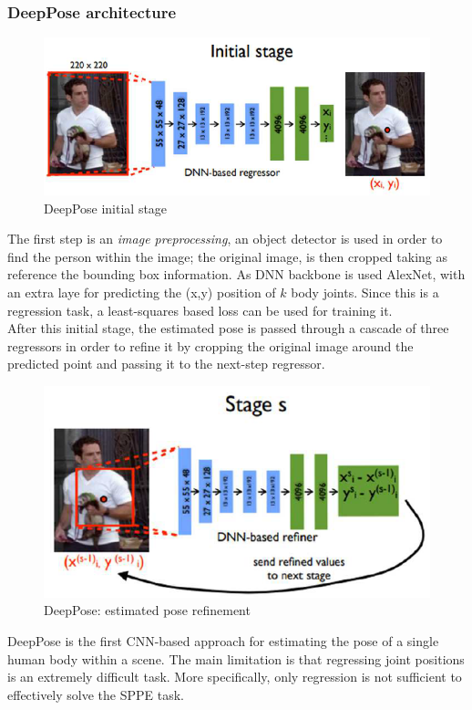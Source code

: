 \subsubsection{DeepPose architecture}
\begin{figure}[h]
    \centering
    \includegraphics[scale=0.7]{img/DeepPose.png}
    \caption{DeepPose initial stage}
\end{figure}
The first step is an \textit{image preprocessing}, an object detector is used in order to find the person within the image; the original image, is then cropped taking as reference the bounding box information. As DNN backbone is used AlexNet, with an extra laye for predicting the (x,y) position of $k$ body joints. Since this is a regression task, a least-squares based loss can be used for training it. \\
After this initial stage, the estimated pose is passed through a cascade of three regressors in order to refine it by cropping the original image around the predicted point and passing it to the next-step regressor.
\vspace{-0.5cm}
\begin{figure}[h]
    \centering 
    \includegraphics[scale=0.8]{img/DeepPose2.png}
    \caption{DeepPose: estimated pose refinement}
\end{figure}
DeepPose is the first CNN-based approach for estimating the pose of a single human body within a scene. The main limitation is that regressing joint positions is an extremely difficult task. More specifically, only regression is not sufficient to effectively solve the SPPE task. 


